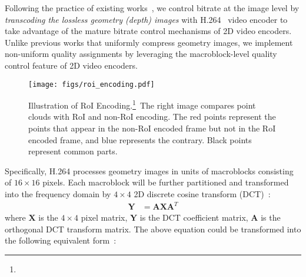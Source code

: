Following the practice of existing works~\cite{rudolph2023rabbit, shen2021rate, wang2023vqba}, we control bitrate at the image level by \textit{transcoding the lossless geometry (depth) images} with H.264~\cite{wiegand2003overview} video encoder to take advantage of the mature bitrate control mechanisms of 2D video encoders. Unlike previous works that uniformly compress geometry images, we implement non-uniform quality assignments by leveraging the macroblock-level quality control feature of 2D video encoders.

\begin{figure}[t]
\setlength{\abovecaptionskip}{0.2cm}
\setlength{\belowcaptionskip}{-0.2cm}
  \centering
    \texttt{[image: figs/roi\_encoding.pdf]}
  \caption[]{Illustration of RoI Encoding.\protect\footnote{}\ The right image compares point clouds with RoI and non-RoI encoding. The red points represent the points that appear in the non-RoI encoded frame but not in the RoI encoded frame, and blue represents the contrary. Black points represent common parts.}
  \label{fig-roi-encoding}
\end{figure}

Specifically, H.264 processes geometry images in units of macroblocks consisting of $16\times16$ pixels. Each macroblock will be further partitioned and transformed into the frequency domain by $4\times4$ 2D discrete cosine transform (DCT)~\cite{wiegand2003overview}:
\begin{align*}
    \mathbf{Y}&=\mathbf{A}\mathbf{X}\mathbf{A}^T
\end{align*}
where $\mathbf{X}$ is the $4\times4$ pixel matrix, $\mathbf{Y}$ is the DCT coefficient matrix, $\mathbf{A}$ is the orthogonal DCT transform matrix.
The above equation could be transformed into the following equivalent form~\cite{Richardson2003H2P}:

